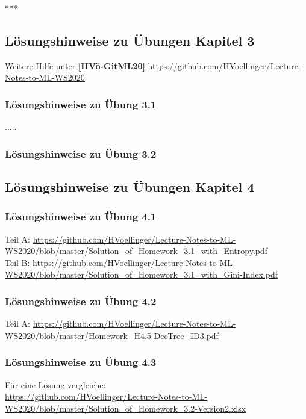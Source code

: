 \documentclass[12pt]{article}
\begin{document}
***\\
\subsection{Lösungshinweise zu Übungen Kapitel 3}

\hspace*{-1.8cm} Weitere Hilfe unter \textbf{[HVö-GitML20]} \url{https://github.com/HVoellinger/Lecture-Notes-to-ML-WS2020}\\


\subsubsection{Lösungshinweise zu Übung 3.1}


.....\\

\subsubsection{Lösungshinweise zu Übung 3.2} 


\newpage

\subsection{Lösungshinweise zu Übungen Kapitel 4}

\subsubsection{Lösungshinweise zu Übung 4.1}
%
Teil A: \url{https://github.com/HVoellinger/Lecture-Notes-to-ML-WS2020/blob/master/Solution_of_Homework_3.1_with_Entropy.pdf}
\\[0.2cm]
%
Teil B: \url{https://github.com/HVoellinger/Lecture-Notes-to-ML-WS2020/blob/master/Solution_of_Homework_3.1_with_Gini-Index.pdf}
%
\subsubsection{Lösungshinweise zu Übung 4.2}
%
Teil A: \url{https://github.com/HVoellinger/Lecture-Notes-to-ML-WS2020/blob/master/Homework_H4.5-DecTree_ID3.pdf}
%
\subsubsection{Lösungshinweise zu Übung 4.3}
%
Für eine Lösung vergleiche:\\
\url{https://github.com/HVoellinger/Lecture-Notes-to-ML-WS2020/blob/master/Solution_of_Homework_3.2-Version2.xlsx}
%
\end{document}
